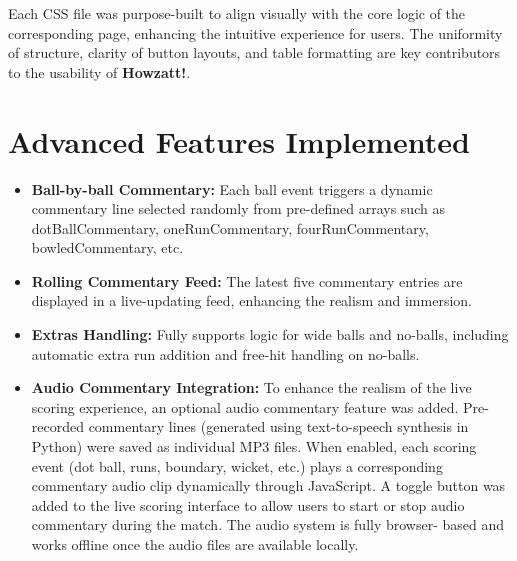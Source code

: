 \documentclass[a4paper,10pt]{article}
\begin{document}
Each CSS file was purpose-built to align visually with the core logic of the corresponding page, enhancing the intuitive experience for users. The uniformity of structure, clarity of button layouts, and table formatting are key contributors to the usability of \textbf{Howzatt!}.


\section{Advanced Features Implemented}
\begin{itemize}
    \item \textbf{Ball-by-ball Commentary:} Each ball event triggers a dynamic commentary line selected randomly from pre-defined arrays such as dotBallCommentary, oneRunCommentary, fourRunCommentary, bowledCommentary, etc.
    \item \textbf{Rolling Commentary Feed:} The latest five commentary entries are displayed in a live-updating feed, enhancing the realism and immersion.
    \item \textbf{Extras Handling:} Fully supports logic for wide balls and no-balls, including automatic extra run addition and free-hit handling on no-balls.
    \item \textbf{Audio Commentary Integration:}
To enhance the realism of the live scoring experience, an optional audio commentary feature was added. Pre-recorded commentary lines (generated using text-to-speech synthesis in Python) were saved as individual MP3 files. When enabled, each scoring event (dot ball, runs, boundary, wicket, etc.) plays a corresponding commentary audio clip dynamically through JavaScript. A toggle button was added to the live scoring interface to allow users to start or  stop audio commentary during the match. The audio system is fully browser-   based and works offline once the audio files are available locally.


\end{itemize}
\end{document}
